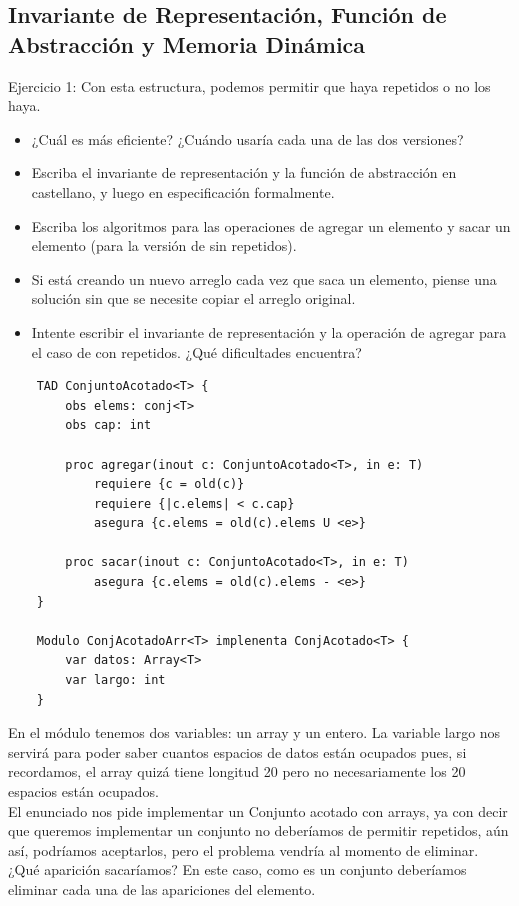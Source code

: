\documentclass[10pt,a4paper]{article}
\begin{document}
\subsection*{Invariante de Representación, Función de Abstracción y Memoria Dinámica}
\label{subsec:anexo_invrep_abs}
Ejercicio 1: Con esta estructura, podemos permitir que haya repetidos o no los haya.
\begin{itemize}
    \item ¿Cuál es más eficiente? ¿Cuándo usaría cada una de las dos versiones? 
    \item Escriba el invariante de representación y la función de abstracción en castellano, y luego en especificación formalmente.
    \item Escriba los algoritmos para las operaciones de agregar un elemento y sacar un elemento (para la versión de sin repetidos).
    \item Si está creando un nuevo arreglo cada vez que saca un elemento, piense una solución sin que se necesite copiar el arreglo original.
    \item Intente escribir el invariante de representación y la operación de agregar para el caso de con repetidos. ¿Qué dificultades encuentra?
\end{itemize}
\begin{lstlisting}
    TAD ConjuntoAcotado<T> {
        obs elems: conj<T>
        obs cap: int
        
        proc agregar(inout c: ConjuntoAcotado<T>, in e: T)
            requiere {c = old(c)}
            requiere {|c.elems| < c.cap}
            asegura {c.elems = old(c).elems U <e>}
        
        proc sacar(inout c: ConjuntoAcotado<T>, in e: T)
            asegura {c.elems = old(c).elems - <e>}
    }

    Modulo ConjAcotadoArr<T> implenenta ConjAcotado<T> {
        var datos: Array<T>
        var largo: int
    }
\end{lstlisting}
En el módulo tenemos dos variables: un array y un entero. La variable largo nos servirá para poder saber cuantos espacios de datos están ocupados pues, si recordamos, el array quizá tiene longitud 20 pero no necesariamente los 20 espacios están ocupados. \\
El enunciado nos pide implementar un Conjunto acotado con arrays, ya con decir que queremos implementar un conjunto no deberíamos de permitir repetidos, aún así, podríamos aceptarlos, pero el problema vendría al momento de eliminar. ¿Qué aparición sacaríamos? En este caso, como es un conjunto deberíamos eliminar cada una de las apariciones del elemento. \\
\end{document}
